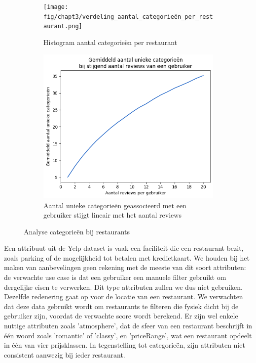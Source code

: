 \begin{figure}[H]
    \begin{subfigure}{.5\textwidth}
        \centering
        \texttt{[image: fig/chapt3/verdeling\_aantal\_categorieën\_per\_restaurant.png]}
        \caption{Histogram aantal categorieën per restaurant}
        \label{fig:chapt3_verdeling_aantal_categorieën_per_restaurant}
    \end{subfigure}
    \begin{subfigure}{.5\textwidth}
        \centering
        \includegraphics[width=1\linewidth]{fig/chapt3/stijging_categorieen_per_gebruiker.png}
        \caption{Aantal unieke categorieën geassocieerd met een gebruiker stijgt lineair met het aantal reviews}
        \label{fig:chapt3_stijging_categorieen_per_gebruiker}
    \end{subfigure}
    \caption{Analyse categorieën bij restaurants}
    \label{fig:chapt3_categorieen_combined}
\end{figure}


Een attribuut uit de Yelp dataset is vaak een faciliteit die een restaurant bezit, zoals parking of de mogelijkheid tot betalen met kredietkaart. We houden bij het maken van aanbevelingen geen rekening met de meeste van dit soort attributen: de verwachte use case is dat een gebruiker een manuele filter gebruikt om dergelijke eisen te verwerken. Dit type attributen zullen we dus niet gebruiken. Dezelfde redenering gaat op voor de locatie van een restaurant. We verwachten dat deze data gebruikt wordt om restaurants te filteren die fysiek dicht bij de gebruiker zijn, voordat de verwachte score wordt berekend.\newline
Er zijn wel enkele nuttige attributen zoals 'atmosphere', dat de sfeer van een restaurant beschrijft in één woord zoals 'romantic' of 'classy', en 'priceRange', wat een restaurant opdeelt in één van vier prijsklassen. In tegenstelling tot categorieën, zijn attributen niet consistent aanwezig bij ieder restaurant. 
